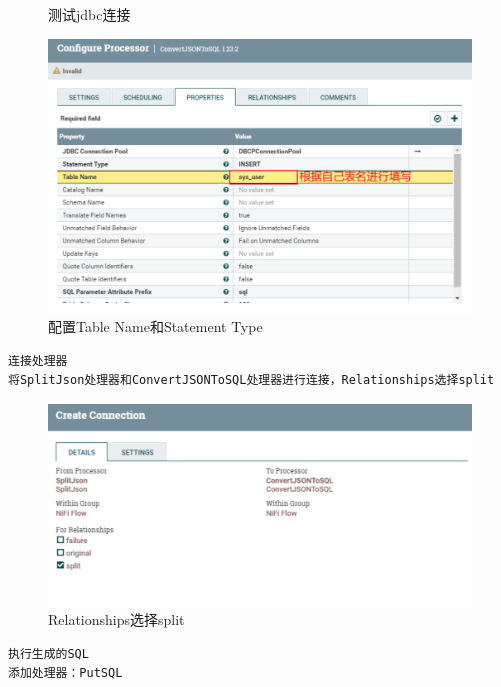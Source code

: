 \documentclass{article}
\begin{document}
\begin{enumerate}
\begin{figure}[htp]
        \caption{测试jdbc连接}
        \label{pic6}
    \end{figure}
    \begin{figure}[htp]
        \centering
        \includegraphics[width=13cm]{配置jsonTo2.png}
        \caption{配置Table Name和Statement Type}
        \label{pic6}
    \end{figure}
    \newpage
    \begin{lstlisting}
连接处理器
将SplitJson处理器和ConvertJSONToSQL处理器进行连接，Relationships选择split
    \end{lstlisting}
    \begin{figure}[htp]
        \centering
        \includegraphics[width=13cm]{连接2.png}
        \caption{Relationships选择split}
        \label{pic6}
    \end{figure}
    \newpage
    \begin{lstlisting}
执行生成的SQL
添加处理器：PutSQL
    \end{lstlisting}
    \begin{figure}[htp]
        \centering

\end{figure}
\end{enumerate}
\end{document}
